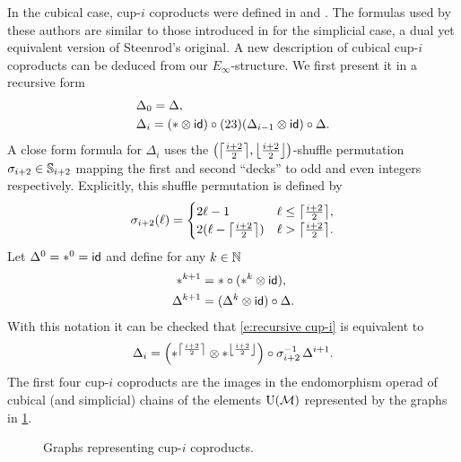 In the cubical case, cup-$i$ coproducts were defined in \cite{kadeishvili1999coproducts} and \cite{pilarczyk2016cubical}.
The formulas used by these authors are similar to those introduced in \cite{medina2022fast_sq} for the simplicial case, a dual yet equivalent version of Steenrod's original.
A new description of cubical cup-$i$ coproducts can be deduced from our $E_\infty$-structure.
We first present it in a recursive form
\begin{equation} \label{e:recursive cup-i}
	\begin{split}
		& \Delta_0 = \Delta, \\
		& \Delta_i =
		(\ast \ot \id) \circ (23)(\Delta_{i-1} \ot \id) \circ \Delta.
	\end{split}
\end{equation}
A close form formula for $\Delta_i$ uses the $\big(\ceil*{\frac{i+2}{2}}, \floor*{\frac{i+2}{2}}\big)$-shuffle permutation $\sigma_{i+2} \in \sym_{i+2}$ mapping the first and second ``decks'' to odd and even integers respectively.
Explicitly, this shuffle permutation is defined by
\begin{equation} \label{e:shuffle perm}
	\sigma_{i+2}(\ell) =
	\begin{cases}
		2\ell-1 & \ell \leq \ceil*{\frac{i+2}{2}}, \\
		2(\ell-\ceil*{\frac{i+2}{2}}) & \ell > \ceil*{\frac{i+2}{2}}.
	\end{cases}
\end{equation}
Let $\Delta^0 = \ast^0 = \id$ and define for any $k \in \N$
\begin{equation} \label{e:iterated comb}
	\begin{split}
		\ast^{k+1} &= \ast \circ (\ast^k \ot \id), \\
		\Delta^{k+1} &= (\Delta^k \ot \id) \circ \Delta.
	\end{split}
\end{equation}
With this notation it can be checked that \cref{e:recursive cup-i} is equivalent to
\begin{equation} \label{e:closed cup-i}
	\Delta_i = \left(\ast^{\ceil*{\frac{i+2}{2}}} \ot \ast^{\floor*{\frac{i+2}{2}}}\right) \circ \sigma_{i+2}^{-1} \, \Delta^{i+1}.
\end{equation}
The first four cup-$i$ coproducts are the images in the endomorphism operad of cubical (and simplicial) chains of the elements $\UM$ represented by the graphs in \cref{f:cup-i}.

\begin{figure}[h!]
	\centering
	
	\caption{Graphs representing cup-$i$ coproducts.}
	\label{f:cup-i}
\end{figure}

